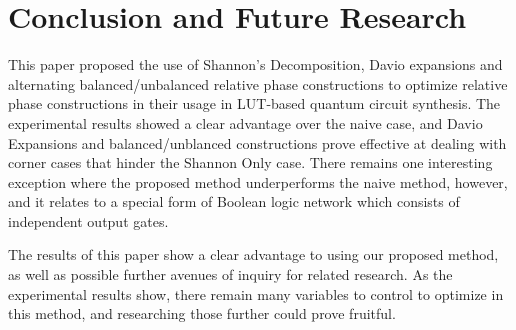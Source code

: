 \vspace*{-0.25cm}
\section{Conclusion and Future Research}
\label{Sec:concl}
This paper proposed the use of Shannon's Decomposition, Davio expansions and alternating
balanced/unbalanced relative phase constructions to optimize relative phase constructions
in their usage in LUT-based quantum circuit synthesis. The experimental results showed a
clear advantage over the naive case, and Davio Expansions and balanced/unblanced constructions
prove effective at dealing with corner cases that hinder the Shannon Only case. There remains 
one interesting exception where the proposed method underperforms the naive method, however, 
and it relates to a special form of Boolean logic network which consists of independent output gates.

The results of this paper show a clear advantage to using our proposed method, as well as possible further avenues of inquiry for related research. As the experimental results show, there remain many variables to control to optimize in this method, and researching those further could prove fruitful.
